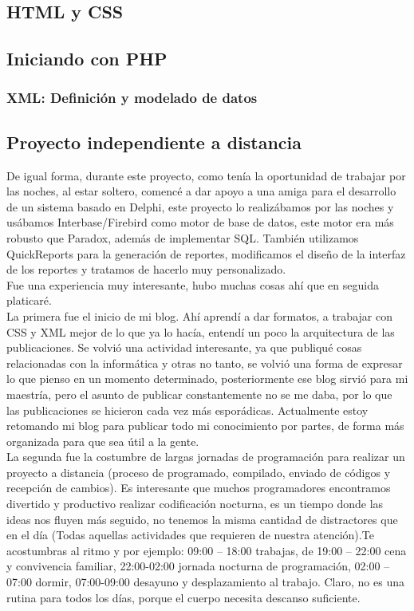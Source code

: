 \documentclass[12pt,spanish,lettersize]{book}
\begin{document}
\subsection{HTML y CSS}
\subsection{Iniciando con PHP}
\subsubsection{XML: Definición y modelado de datos}
\subsection{Proyecto independiente a distancia}

De igual forma, durante este proyecto, como tenía la oportunidad de trabajar por las noches, al estar soltero, comencé a dar apoyo a una amiga para el desarrollo de un sistema basado en Delphi, este proyecto lo realizábamos por las noches y usábamos Interbase/Firebird como motor de base de datos, este motor era más robusto que Paradox, además de implementar SQL. También utilizamos QuickReports para la generación de reportes, modificamos el diseño de la interfaz de los reportes y tratamos de hacerlo muy personalizado.\\

Fue una experiencia muy interesante, hubo muchas cosas ahí que en seguida platicaré.\\

La primera fue el inicio de mi blog. Ahí aprendí a dar formatos, a trabajar con CSS y XML mejor de lo que ya lo hacía, entendí un poco la arquitectura de las publicaciones. Se volvió una actividad interesante, ya que publiqué cosas relacionadas con la informática y otras no tanto, se volvió una forma de expresar lo que pienso en un momento determinado, posteriormente ese blog sirvió para mi maestría, pero el asunto de publicar constantemente no se me daba, por lo que las publicaciones se hicieron cada vez más esporádicas. Actualmente estoy retomando mi blog para publicar todo mi conocimiento por partes, de forma más organizada para que sea útil a la gente.\\

La segunda fue la costumbre de largas jornadas de programación para realizar un proyecto a distancia (proceso de programado, compilado, enviado de códigos y recepción de cambios). Es interesante que muchos programadores encontramos divertido y productivo realizar codificación nocturna, es un tiempo donde las ideas nos fluyen más seguido, no tenemos la misma cantidad de distractores que en el día (Todas aquellas actividades que requieren de nuestra atención).Te acostumbras al ritmo y por ejemplo: 09:00 – 18:00 trabajas, de 19:00 – 22:00 cena y convivencia familiar, 22:00-02:00 jornada nocturna de programación, 02:00 – 07:00 dormir, 07:00-09:00 desayuno y desplazamiento al trabajo. Claro, no es una rutina para todos los días, porque el cuerpo necesita descanso  suficiente.\\
\end{document}
